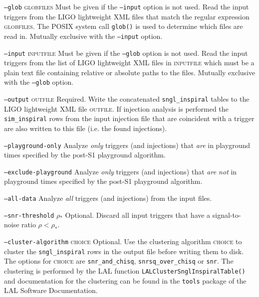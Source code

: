 \begin{entry}
\begin{entry}
\item[\texttt{--glob} \textsc{globfiles}] Must be given if the
\texttt{--input} option is not used. Read the input triggers from the
LIGO lightweight XML files that match the regular expression
\textsc{globfiles}. The POSIX system call \verb$glob()$ is used to determine
which files are read in. Mutually exclusive with the \texttt{--input} option.

\item[\texttt{--input} \textsc{inputfile}] Must be given if the
\texttt{--glob} option is not used. Read the input triggers from the list of
LIGO lightweight XML files in \textsc{inputfile} which must be a plain text
file containing relative or absolute paths to the files.  Mutually exclusive
with the \texttt{--glob} option.

\item[\texttt{--output} \textsc{outfile}] Required. Write the concatenated
\verb$sngl_inspiral$ tables to the LIGO lightweight XML file \textsc{outfile}.
If injection analysis is performed the \verb$sim_inspiral$ rows from the input
injection file that are coincident with a trigger are also written to this
file (i.e. the found injections).

\item[\texttt{--playground-only}] Analyze \emph{only} triggers (and
injections) that \emph{are} in playground times specified by the post-S1
playground algorithm.

\item[\texttt{--exclude-playground}] Analyze \emph{only} triggers (and
injections) that \emph{are not} in playground times specified by the post-S1
playground algorithm.

\item[\texttt{--all-data}] Analyze \emph{all} triggers (and injections) from
the input files.

\item[\texttt{--snr-threshold} \textsc{$\rho_\ast$}] Optional. Discard all
input triggers that have a signal-to-noise ratio $\rho < \rho_\ast$.

\item[\texttt{--cluster-algorithm} \textsc{choice}] Optional. Use the
clustering algorithm \textsc{choice} to cluster the \verb$sngl_inspiral$ rows
in the output file before writing them to disk. The options for
\textsc{choice} are \verb$snr_and_chisq$, \verb$snrsq_over_chisq$ or
\verb$snr$. The clustering is performed by the LAL function
\verb$LALClusterSnglInspiralTable()$ and documentation for the clustering can
be found in the \texttt{tools} package of the LAL Software Documentation.


\end{entry}
\end{entry}
